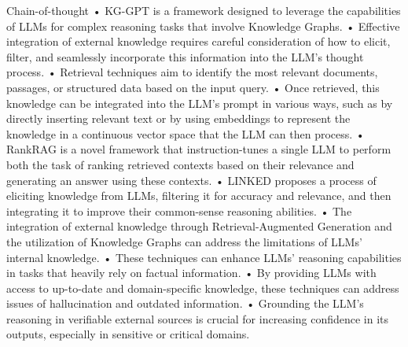 \begin{frame}{Chain-of-thought}
	•	KG-GPT is a framework designed to leverage the capabilities of LLMs for complex reasoning tasks that involve Knowledge Graphs.
	•	Effective integration of external knowledge requires careful consideration of how to elicit, filter, and seamlessly incorporate this information into the LLM’s thought process.
	•	Retrieval techniques aim to identify the most relevant documents, passages, or structured data based on the input query.
	•	Once retrieved, this knowledge can be integrated into the LLM’s prompt in various ways, such as by directly inserting relevant text or by using embeddings to represent the knowledge in a continuous vector space that the LLM can then process.
	•	RankRAG is a novel framework that instruction-tunes a single LLM to perform both the task of ranking retrieved contexts based on their relevance and generating an answer using these contexts.
	•	LINKED proposes a process of eliciting knowledge from LLMs, filtering it for accuracy and relevance, and then integrating it to improve their common-sense reasoning abilities.
	•	The integration of external knowledge through Retrieval-Augmented Generation and the utilization of Knowledge Graphs can address the limitations of LLMs’ internal knowledge.
	•	These techniques can enhance LLMs’ reasoning capabilities in tasks that heavily rely on factual information.
	•	By providing LLMs with access to up-to-date and domain-specific knowledge, these techniques can address issues of hallucination and outdated information.
	•	Grounding the LLM’s reasoning in verifiable external sources is crucial for increasing confidence in its outputs, especially in sensitive or critical domains.

\end{frame}